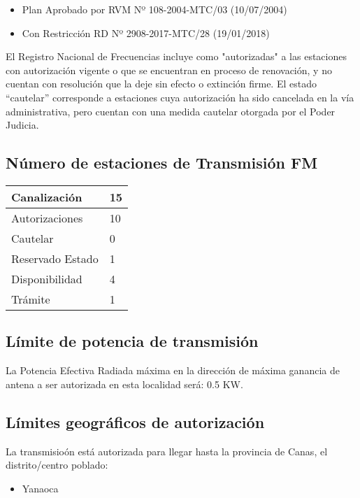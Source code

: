 \documentclass[a4paper]{IEEEtran} %
\begin{document}
\begin{itemize}
	\item Plan Aprobado por RVM Nº 108-2004-MTC/03 (10/07/2004)
	\item Con Restricción RD Nº 2908-2017-MTC/28 (19/01/2018)
\end{itemize}

El Registro Nacional de Frecuencias incluye como "autorizadas" a las estaciones con autorización vigente o que se encuentran en proceso de renovación, y no cuentan con resolución que la deje sin efecto o extinción firme. El estado “cautelar” corresponde a estaciones cuya autorización ha sido cancelada en la vía administrativa, pero cuentan con una medida cautelar otorgada por el Poder Judicia.

\subsection{Número de estaciones de Transmisión FM}

\begin{tabular}{|l|l|} \hline
	Canalización 			& 15 \\ \hline
	Autorizaciones			& 10 \\ \hline
	Cautelar				& 0 \\ \hline
	Reservado Estado		& 1 \\ \hline
	Disponibilidad			& 4 \\ \hline
	Trámite					& 1 \\ \hline 
\end{tabular}

\subsection{Límite de potencia de transmisión}

La Potencia Efectiva Radiada máxima en la dirección de máxima ganancia de antena a ser autorizada en esta localidad será: 0.5 KW.

\subsection{Límites geográficos de autorización}

La transmisioón está autorizada para llegar hasta la provincia de Canas, el distrito/centro poblado:

\begin{itemize}
	\item Yanaoca
\end{itemize}
\end{document}
